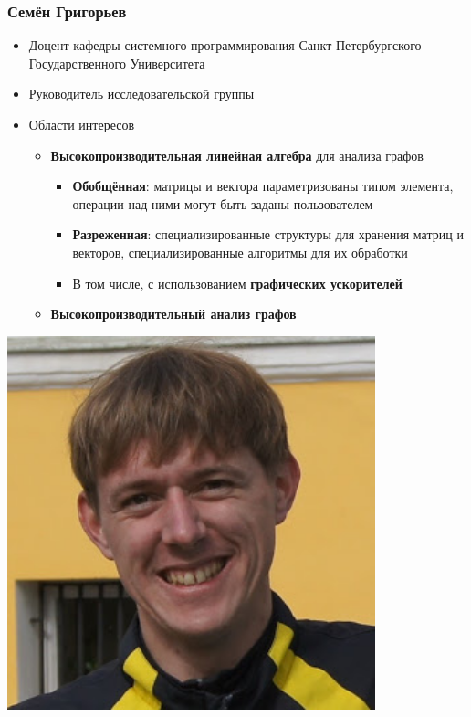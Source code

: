 \documentclass[xcolor=table,aspectratio=169]{beamer}
\begin{document}
\begin{frame}[fragile]
  \frametitle{Семён Григорьев}
  \begin{minipage}{0.70\textwidth}
  \begin{itemize}    
    \item Доцент кафедры системного программирования Санкт-Петербургского Государственного Университета
    \item Руководитель исследовательской группы
    \item Области интересов
    \begin{itemize}
      \item \textbf{Высокопроизводительная линейная алгебра} для анализа графов
      \begin{itemize}
        \item \textbf{Обобщённая}: матрицы и вектора параметризованы типом элемента, операции над ними могут быть заданы пользователем
        \item \textbf{Разреженная}: специализированные структуры для хранения матриц и векторов, специализированные алгоритмы для их обработки 
        \item В том числе, с использованием \textbf{графических ускорителей}
      \end{itemize}
      \item \textbf{Высокопроизводительный анализ графов}      
    \end{itemize}
    \end{itemize}
\end{minipage}
\begin{minipage}[t]{0.29\textwidth}
  \begin{center}
\includegraphics[width=0.8\textwidth]{pictures/SemyonGrigorev.jpg}

\end{center}
\end{minipage}
\end{frame}
\end{document}
